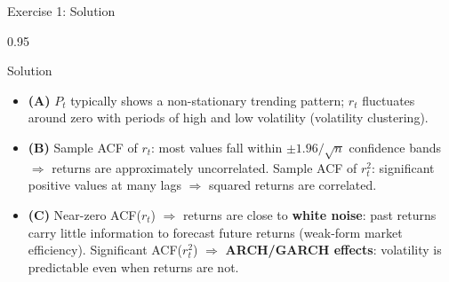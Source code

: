 \documentclass[9pt, aspectratio=169, t]{beamer}
\begin{document}
\begin{frame}{Exercise 1: Solution}
    \begin{cminipage}{0.95\textwidth}
    \begin{exampleblock}{Solution}
        {\small
        \begin{itemize}\setlength{\itemsep}{3pt}
            \item \textcolor{MainBlue}{\textbf{(A)}} $P_t$ typically shows a non-stationary trending pattern; $r_t$ fluctuates around zero with periods of high and low volatility (volatility clustering).
            \item \textcolor{MainBlue}{\textbf{(B)}} Sample ACF of $r_t$: most values fall within $\pm 1.96/\sqrt{n}$ confidence bands $\Rightarrow$ returns are approximately uncorrelated. Sample ACF of $r_t^2$: significant positive values at many lags $\Rightarrow$ squared returns are correlated.
            \item \textcolor{MainBlue}{\textbf{(C)}} Near-zero ACF($r_t$) $\Rightarrow$ returns are close to \textbf{white noise}: past returns carry little information to forecast future returns (weak-form market efficiency). Significant ACF($r_t^2$) $\Rightarrow$ \textbf{ARCH/GARCH effects}: volatility is predictable even when returns are not.
        \end{itemize}
        }
    \end{exampleblock}
    \end{cminipage}
\end{frame}
\end{document}
